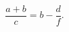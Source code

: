 \documentclass[a4paper]{article}
\title{}
\begin{document}
	\maketitle
	\[
	\frac{a+b}{c}=b-\frac{d}{f}
	.\] 
\end{document}
